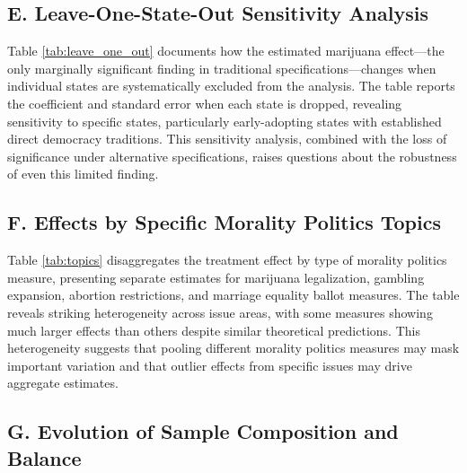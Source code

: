 \documentclass[12pt,letterpaper,oneside]{book}
\newcommand{\basepath}{g:/My Drive/Grad School}
\newcommand{\basepath}{basepath}
\begin{document}

\label{tab:heterogeneity}

\subsection*{E. Leave-One-State-Out Sensitivity Analysis}

Table \ref{tab:leave_one_out} documents how the estimated marijuana effect—the only marginally significant finding in traditional specifications—changes when individual states are systematically excluded from the analysis. The table reports the coefficient and standard error when each state is dropped, revealing sensitivity to specific states, particularly early-adopting states with established direct democracy traditions. This sensitivity analysis, combined with the loss of significance under alternative specifications, raises questions about the robustness of even this limited finding.


\label{tab:leave_one_out}

\subsection*{F. Effects by Specific Morality Politics Topics}

Table \ref{tab:topics} disaggregates the treatment effect by type of morality politics measure, presenting separate estimates for marijuana legalization, gambling expansion, abortion restrictions, and marriage equality ballot measures. The table reveals striking heterogeneity across issue areas, with some measures showing much larger effects than others despite similar theoretical predictions. This heterogeneity suggests that pooling different morality politics measures may mask important variation and that outlier effects from specific issues may drive aggregate estimates.


\label{tab:topics}

\subsection*{G. Evolution of Sample Composition and Balance}
\end{document}
